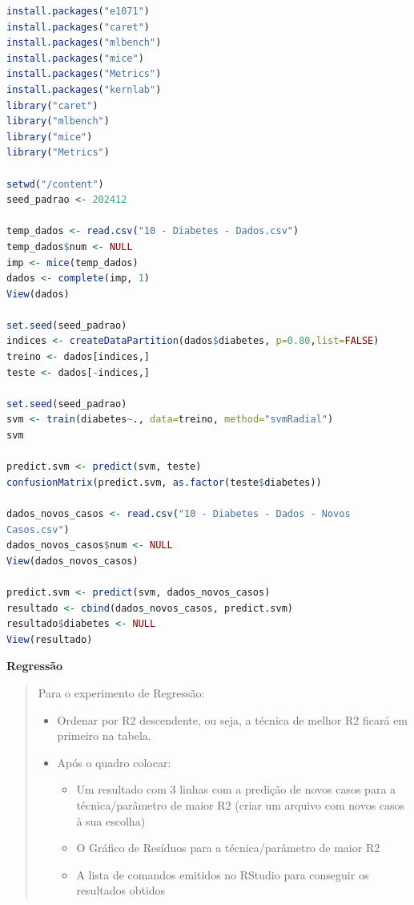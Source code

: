 \begin{lstlisting}[language=R, style=input]
install.packages("e1071")
install.packages("caret")
install.packages("mlbench")
install.packages("mice")
install.packages("Metrics")
install.packages("kernlab")
library("caret")
library("mlbench")
library("mice")
library("Metrics")

setwd("/content")
seed_padrao <- 202412

temp_dados <- read.csv("10 - Diabetes - Dados.csv")
temp_dados$num <- NULL
imp <- mice(temp_dados)
dados <- complete(imp, 1)
View(dados)

set.seed(seed_padrao)
indices <- createDataPartition(dados$diabetes, p=0.80,list=FALSE)
treino <- dados[indices,]
teste <- dados[-indices,]

set.seed(seed_padrao)
svm <- train(diabetes~., data=treino, method="svmRadial")
svm

predict.svm <- predict(svm, teste)
confusionMatrix(predict.svm, as.factor(teste$diabetes))

dados_novos_casos <- read.csv("10 - Diabetes - Dados - Novos
Casos.csv")
dados_novos_casos$num <- NULL
View(dados_novos_casos)

predict.svm <- predict(svm, dados_novos_casos)
resultado <- cbind(dados_novos_casos, predict.svm)
resultado$diabetes <- NULL
View(resultado)
\end{lstlisting}


\begin{adjustwidth}{1em}{}
\textbf{Regressão}
\end{adjustwidth}

\begin{quote}
Para o experimento de Regressão:
\begin{itemize}
    \item Ordenar por R2 descendente, ou seja, a técnica de melhor R2 ficará em primeiro na tabela.
    \item Após o quadro colocar:
    \begin{itemize}
        \item Um resultado com 3 linhas com a predição de novos casos para a técnica/parâmetro de maior R2 (criar um arquivo com novos casos à sua escolha)
        \item O Gráfico de Resíduos para a técnica/parâmetro de maior R2
        \item A lista de comandos emitidos no RStudio para conseguir os resultados obtidos
    \end{itemize}
\end{itemize}
\end{quote}


